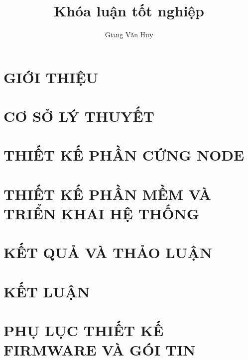 \documentclass[14pt,a4paper]{report}
\title{Khóa luận tốt nghiệp}
\author{Giang Văn Huy}
\begin{document}








\fontsize{13}{15}\selectfont

\chapter{GIỚI THIỆU}








\chapter{CƠ SỞ LÝ THUYẾT}






\chapter{THIẾT KẾ PHẦN CỨNG NODE}






\chapter{THIẾT KẾ PHẦN MỀM VÀ TRIỂN KHAI HỆ THỐNG}





\chapter{KẾT QUẢ VÀ THẢO LUẬN}






\chapter*{KẾT LUẬN}



\appendix
\chapter{PHỤ LỤC THIẾT KẾ FIRMWARE VÀ GÓI TIN}

\end{document}
